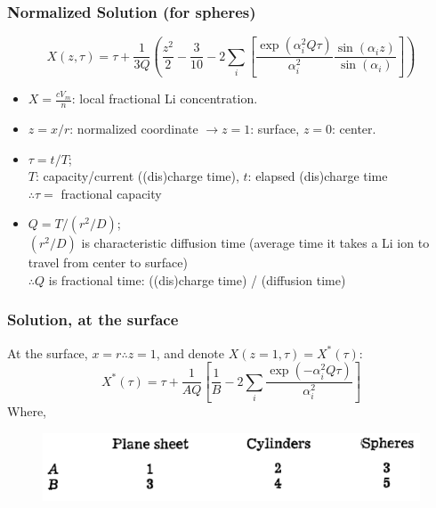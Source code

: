 \documentclass{beamer}
\begin{document}
\begin{frame}
\frametitle{Normalized Solution (for spheres)}

\begin{equation*}
X(z, \tau) = \tau + \frac{1}{3Q} \left(\frac{z^2}{2} - \frac{3}{10} -2 \sum_{i} \left[\frac{\exp(\alpha_i^2 Q\tau)}{\alpha_i^2} \frac{\sin(\alpha_i z)}{\sin(\alpha_i)} \right] \right)
\end{equation*}
\begin{itemize}
	\item $X = \frac{cV_m}{n}$: local fractional Li concentration.
	\item $z = x/r$: normalized coordinate  $\rightarrow z=1$: surface, $z=0$: center.
	\item $\tau = t/T$; \\
		  $T$: capacity/current ((dis)charge time), $t$: elapsed (dis)charge time\\ 
		  $\therefore \tau=$ fractional capacity
	\item $Q = T/(r^2/D)$; \\
		  $(r^2/D)$ is characteristic diffusion time (average time it takes a Li ion to travel from center to surface) \\
		  $\therefore Q$ is fractional time: ((dis)charge time) / (diffusion time)
\end{itemize}

\end{frame}

\begin{frame}
\frametitle{Solution, at the surface}

At the surface, $x=r \therefore z=1$, and denote $X(z=1, \tau) = X^*(\tau)$:
\begin{equation*}
X^*(\tau) = \tau + \frac{1}{AQ} \left[ \frac{1}{B} - 2 \sum_{i}\frac{\exp(-\alpha_i^2 Q\tau)}{\alpha_i^2}  \right]
\end{equation*}
Where, 
\begin{figure}
	\includegraphics[width=0.65\linewidth]{figs/atlung_constants.pdf}
\end{figure}

\end{frame}
\end{document}
